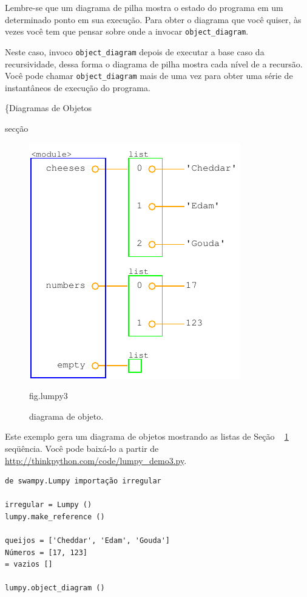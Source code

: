 \documentclass[10pt]{book}
\begin{document}
\begin{v erbatim}
{Lembre-se que um diagrama de pilha mostra o estado do programa em
um determinado ponto em sua execução. Para obter o diagrama que você quiser,
às vezes você tem que pensar sobre onde a invocar \verb "object_diagram".

Neste caso, invoco \verb "object_diagram" depois de executar a base
caso da recursividade, dessa forma o diagrama de pilha mostra cada nível de
a recursão. Você pode chamar \verb "object_diagram" mais de uma vez para
obter uma série de instantâneos de execução do programa.


\{Diagramas de Objetos} secção

\begin{figure}
\centerline
{\includegraphics[scale = 0.7] {figs/lumpydemo3.pdf}}
\caption{diagrama de objeto.}
\label{} fig.lumpy3
\end{figure}

Este exemplo gera um diagrama de objetos mostrando as listas de
Seção ~ \ref {} seqüência. Você pode baixá-lo a partir de
\url{http://thinkpython.com/code/lumpy_demo3.py}.
 

\begin{verbatim}
de swampy.Lumpy importação irregular

irregular = Lumpy ()
lumpy.make_reference ()

queijos = ['Cheddar', 'Edam', 'Gouda']
Números = [17, 123]
= vazios []

lumpy.object_diagram ()
\end{verbatim}


\end{v erbatim}
\end{document}
